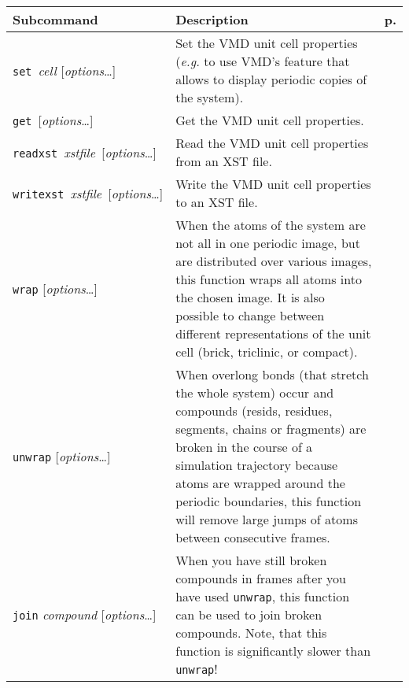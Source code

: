 \documentclass[a4paper, DIV12]{scrartcl}
\newcommand{\eg}{\emph{e.g.}\xspace}
\begin{document}
\begin{table}[p]
  \centering
  \begin{tabular}{|p{}|p{}|r|}
    \hline
    \textbf{Subcommand} & \textbf{Description} & \textbf{p.}\\\hline\hline
    
    \mbox{\texttt{set} \textit{cell}} [\textit{options}\dots]
    & Set the VMD unit cell properties (\eg to use VMD's feature that
    allows to display periodic copies of the system). 
    & \pageref{sec:set}
    \\\hline
  
    \mbox{\texttt{get} [\textit{options}\dots]}
    & Get the VMD unit cell properties. 
    & \pageref{sec:get}
    \\\hline

    \mbox{\texttt{readxst} \textit{xstfile} [\textit{options}\dots]}
    & Read the VMD unit cell properties from an XST file.
    & \pageref{sec:readxst} 
    \\\hline

    \mbox{\texttt{writexst} \textit{xstfile} [\textit{options}\dots]}
    & Write the VMD unit cell properties to an XST file.
    & \pageref{sec:writexst} 
    \\\hline
  
    \texttt{wrap} [\textit{options}\dots]
    & When the atoms of the system are not all in one periodic image,
    but are distributed over various images, this function wraps all
    atoms into the chosen image. It is also possible to change between
    different representations of the unit cell (brick, triclinic, or compact).
    & \pageref{sec:wrap}
    \\\hline
  
    \texttt{unwrap} [\textit{options}\dots]
    & When overlong bonds (that stretch the whole system) occur and
    compounds (resids, residues, segments, chains or fragments) are broken in
    the course of a simulation trajectory because atoms are wrapped
    around the periodic boundaries, this function will remove large
    jumps of atoms between consecutive frames.
    & \pageref{sec:unwrap}
    \\\hline
  
    \texttt{join} \textit{compound} [\textit{options}\dots]
    & When you have still broken compounds in frames after you have
    used \texttt{unwrap}, this function can be used to join broken
    compounds. Note, that this function is significantly slower than
    \texttt{unwrap}!
    & \pageref{sec:join}
    \\\hline
  

\end{tabular}
\end{table}
\end{document}
